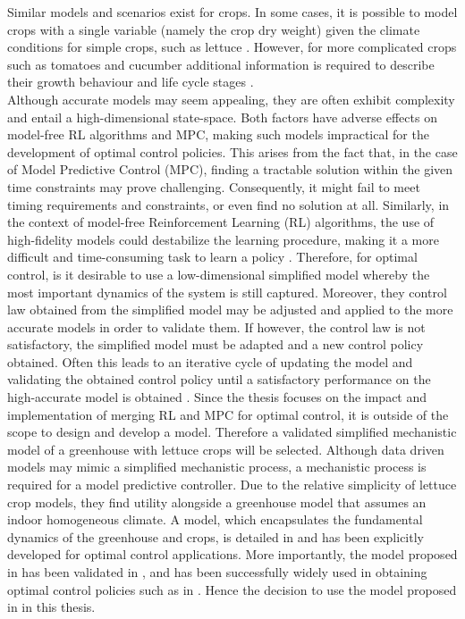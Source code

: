 Similar models and scenarios exist for crops. In some cases, it is possible to model crops with a single variable (namely the crop dry weight) given the climate conditions for simple crops, such as lettuce \cite{royPAPrecisionAgriculture2002}. However, for more complicated crops such as tomatoes and cucumber additional  information is required to describe their growth behaviour and life cycle stages \cite{kuijpersModelSelectionCommon2019}. 
\\
Although accurate models may seem appealing, they are often exhibit complexity and entail a high-dimensional state-space. Both factors have adverse effects on model-free RL algorithms and MPC, making such models impractical for the development of optimal control policies. This arises from the fact that, in the case of Model Predictive Control (MPC), finding a tractable solution within the given time constraints may prove challenging. Consequently, it might fail to meet timing requirements and constraints, or even find no solution at all. Similarly, in the context of model-free Reinforcement Learning (RL) algorithms, the use of high-fidelity models could destabilize the learning procedure, making it a more difficult and time-consuming task to learn a policy \cite{lawrynczukMPCAlgorithms2014,dulac-arnoldChallengesRealWorldReinforcement2019}. Therefore, for optimal control, is it desirable to use a low-dimensional simplified model whereby the most important dynamics of the system is still captured. Moreover, they control law obtained from the simplified model may be adjusted and applied to the more accurate models in order to validate them. If however, the control law is not satisfactory, the simplified model must be adapted and a new control policy obtained. Often this leads to an iterative cycle of updating the model and validating the obtained control policy until a satisfactory performance on the high-accurate model is obtained \cite{knibbeDigitalTwinsGreen2022}. Since the thesis focuses on the impact and implementation of merging RL and MPC for optimal control, it is outside of the scope to design and develop a model.
Therefore a validated simplified mechanistic model of a greenhouse with lettuce crops will be selected. Although data driven models may mimic a simplified mechanistic process, a mechanistic process is required for a model predictive controller. 
Due to the relative simplicity of lettuce crop models, they find utility alongside a greenhouse model that assumes an indoor homogeneous climate. A model, which encapsulates the fundamental dynamics of the greenhouse and crops, is detailed in \cite{hentenGreenhouseClimateManagement1994} and has been explicitly developed for optimal control applications. More importantly, the model proposed in \cite{hentenGreenhouseClimateManagement1994} has been validated in \cite{vanhentenValidationDynamicLettuce1994}, and has been successfully widely used in obtaining optimal control policies such as in \cite{jansenOptimalControlLettuce2023,vanstratenOptimalGreenhouseCultivation2010,ghoumariNonlinearConstrainedMPC2005,lubbersAutonomousGreenhouseClimate2023, morcegoReinforcementLearningModel2023}. Hence the decision to use the model proposed in \cite{hentenGreenhouseClimateManagement1994} in this thesis.



